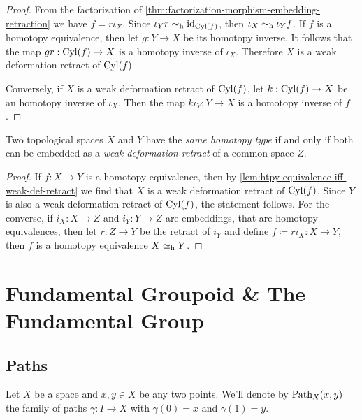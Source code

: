 \begin{proof}
From the factorization of \cref{thm:factorization-morphism-embedding-retraction}
we have \(f = r \iota_X\). Since \(\iota_Y r \sim_{\text{h}} \operatorname{id}_{\operatorname{Cyl}(f)}\), then
\(\iota_X \sim_{\text{h}} \iota_Y f\). If \(f\) is a homotopy equivalence, then let
\(g: Y \to X\) be its homotopy inverse. It follows that the map
\(g r: \operatorname{Cyl}(f) \to X\) is a homotopy inverse of \(\iota_X\). Therefore \(X\) is
a weak deformation retract of \(\operatorname{Cyl}(f)\)

Conversely, if \(X\) is a weak deformation retract of \(\operatorname{Cyl}(f)\), let
\(k: \operatorname{Cyl}(f) \to X\) be an homotopy inverse of \(\iota_X\). Then the map \(k
\iota_Y: Y \to X\) is a homotopy inverse of \(f\).
\end{proof}

\begin{theorem}
\label{thm:same-htpy-type-iff-emb-weak-deformation-retract}
Two topological spaces \(X\) and \(Y\) have the \emph{same homotopy type} if and
only if both can be embedded as a \emph{weak deformation retract} of a common
space \(Z\).
\end{theorem}

\begin{proof}
If \(f: X \to Y\) is a homotopy equivalence, then by
\cref{lem:htpy-equivalence-iff-weak-def-retract} we find that \(X\) is a weak
deformation retract of \(\operatorname{Cyl}(f)\). Since \(Y\) is also a weak deformation
retract of \(\operatorname{Cyl}(f)\), the statement follows. For the converse, if \(i_X: X \to
Z\) and \(i_Y: Y \to Z\) are embeddings, that are homotopy equivalences, then
let \(r: Z \to Y\) be the retract of \(i_Y\) and define \(f \coloneq r i_X: X
\to Y\), then \(f\) is a homotopy equivalence \(X \simeq_{\text{h}} Y\).
\end{proof}

\section{Fundamental Groupoid \& The Fundamental Group}

\subsection{Paths}

\begin{notation}
\label{not:family-of-paths}
Let \(X\) be a space and \(x, y \in X\) be any two points. We'll denote by
\(\operatorname{Path}_X(x, y)\) the family of paths \(\gamma: I \to X\) with \(\gamma(0) = x\) and \(\gamma(1) = y\).
\end{notation}

